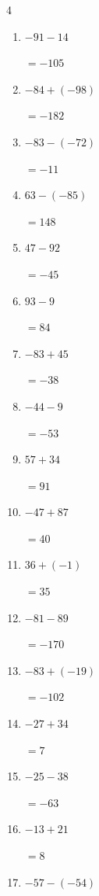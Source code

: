 \begin{multicols}{4}
\begin{enumerate}
        $=-134$

  \item $-91-14$

        $=-105$

  \item $-84+(-98)$

        $=-182$

  \item $-83-(-72)$

        $=-11$

  \item $63-(-85)$

        $=148$

  \item $47-92$

        $=-45$

  \item $93-9$

        $=84$

  \item $-83+45$

        $=-38$

  \item $-44-9$

        $=-53$

  \item $57+34$

        $=91$

  \item $-47+87$

        $=40$

  \item $36+(-1)$

        $=35$

  \item $-81-89$

        $=-170$

  \item $-83+(-19)$

        $=-102$

  \item $-27+34$

        $=7$

  \item $-25-38$

        $=-63$

  \item $-13+21$

        $=8$

  \item $-57-(-54)$


\end{enumerate}
\end{multicols}

